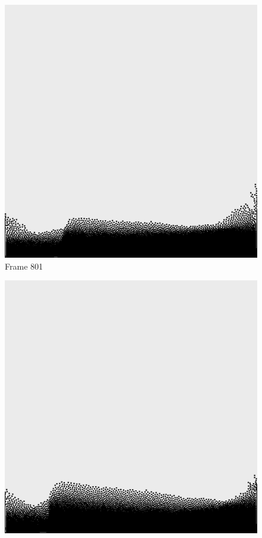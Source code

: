 \documentclass[a4paper, 12pt, oneside]{book}
\begin{document}
\begin{figure}[!ht]
        \begin{center}
            \includegraphics[width=\linewidth]{images/test_case_2/801.png}
            Frame 801
        \end{center}
    \endminipage
    \hfill
        \begin{center}
            \includegraphics[width=\linewidth]{images/test_case_2/821.png}

\end{center}
\end{figure}
\end{document}
